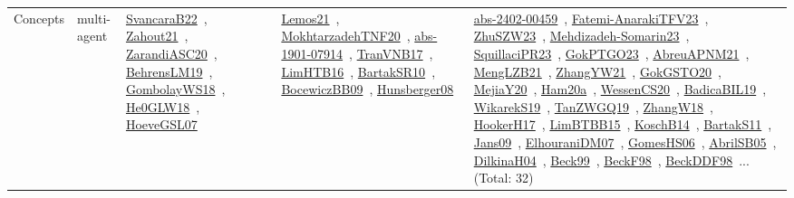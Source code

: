 {\begin{longtable}{lp{3cm}>{\raggedright\arraybackslash}p{6cm}>{\raggedright\arraybackslash}p{6cm}>{\raggedright\arraybackslash}p{8cm}}
Concepts & multi-agent & \href{../works/SvancaraB22.pdf}{SvancaraB22}~\cite{SvancaraB22}, \href{../works/Zahout21.pdf}{Zahout21}~\cite{Zahout21}, \href{../works/ZarandiASC20.pdf}{ZarandiASC20}~\cite{ZarandiASC20}, \href{../works/BehrensLM19.pdf}{BehrensLM19}~\cite{BehrensLM19}, \href{../works/GombolayWS18.pdf}{GombolayWS18}~\cite{GombolayWS18}, \href{../works/He0GLW18.pdf}{He0GLW18}~\cite{He0GLW18}, \href{../works/HoeveGSL07.pdf}{HoeveGSL07}~\cite{HoeveGSL07} & \href{../works/Lemos21.pdf}{Lemos21}~\cite{Lemos21}, \href{../works/MokhtarzadehTNF20.pdf}{MokhtarzadehTNF20}~\cite{MokhtarzadehTNF20}, \href{../works/abs-1901-07914.pdf}{abs-1901-07914}~\cite{abs-1901-07914}, \href{../works/TranVNB17.pdf}{TranVNB17}~\cite{TranVNB17}, \href{../works/LimHTB16.pdf}{LimHTB16}~\cite{LimHTB16}, \href{../works/BartakSR10.pdf}{BartakSR10}~\cite{BartakSR10}, \href{../works/BocewiczBB09.pdf}{BocewiczBB09}~\cite{BocewiczBB09}, \href{../works/Hunsberger08.pdf}{Hunsberger08}~\cite{Hunsberger08} & \href{../works/abs-2402-00459.pdf}{abs-2402-00459}~\cite{abs-2402-00459}, \href{../works/Fatemi-AnarakiTFV23.pdf}{Fatemi-AnarakiTFV23}~\cite{Fatemi-AnarakiTFV23}, \href{../works/ZhuSZW23.pdf}{ZhuSZW23}~\cite{ZhuSZW23}, \href{../works/Mehdizadeh-Somarin23.pdf}{Mehdizadeh-Somarin23}~\cite{Mehdizadeh-Somarin23}, \href{../works/SquillaciPR23.pdf}{SquillaciPR23}~\cite{SquillaciPR23}, \href{../works/GokPTGO23.pdf}{GokPTGO23}~\cite{GokPTGO23}, \href{../works/AbreuAPNM21.pdf}{AbreuAPNM21}~\cite{AbreuAPNM21}, \href{../works/MengLZB21.pdf}{MengLZB21}~\cite{MengLZB21}, \href{../works/ZhangYW21.pdf}{ZhangYW21}~\cite{ZhangYW21}, \href{../works/GokGSTO20.pdf}{GokGSTO20}~\cite{GokGSTO20}, \href{../works/MejiaY20.pdf}{MejiaY20}~\cite{MejiaY20}, \href{../works/Ham20a.pdf}{Ham20a}~\cite{Ham20a}, \href{../works/WessenCS20.pdf}{WessenCS20}~\cite{WessenCS20}, \href{../works/BadicaBIL19.pdf}{BadicaBIL19}~\cite{BadicaBIL19}, \href{../works/WikarekS19.pdf}{WikarekS19}~\cite{WikarekS19}, \href{../works/TanZWGQ19.pdf}{TanZWGQ19}~\cite{TanZWGQ19}, \href{../works/ZhangW18.pdf}{ZhangW18}~\cite{ZhangW18}, \href{../works/HookerH17.pdf}{HookerH17}~\cite{HookerH17}, \href{../works/LimBTBB15.pdf}{LimBTBB15}~\cite{LimBTBB15}, \href{../works/KoschB14.pdf}{KoschB14}~\cite{KoschB14}, \href{../works/BartakS11.pdf}{BartakS11}~\cite{BartakS11}, \href{../works/Jans09.pdf}{Jans09}~\cite{Jans09}, \href{../works/ElhouraniDM07.pdf}{ElhouraniDM07}~\cite{ElhouraniDM07}, \href{../works/GomesHS06.pdf}{GomesHS06}~\cite{GomesHS06}, \href{../works/AbrilSB05.pdf}{AbrilSB05}~\cite{AbrilSB05}, \href{../works/DilkinaH04.pdf}{DilkinaH04}~\cite{DilkinaH04}, \href{../works/Beck99.pdf}{Beck99}~\cite{Beck99}, \href{../works/BeckF98.pdf}{BeckF98}~\cite{BeckF98}, \href{../works/BeckDDF98.pdf}{BeckDDF98}~\cite{BeckDDF98}... (Total: 32)\\

\end{longtable}}
